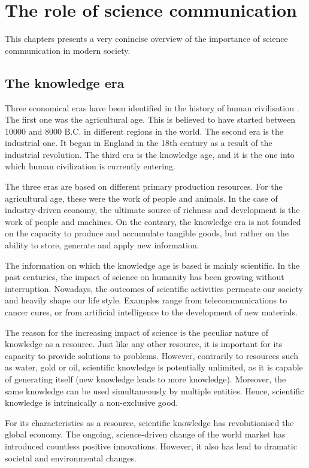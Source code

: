 \chapter{The role of science communication}
This chapters presents a very conincise overview of the importance of science communication in modern society. 

\section{The knowledge era}
Three economical eras have been identified in the history of human civilisation \cite{Aasi1}. The first one was the agricultural age. This is believed to have started between 10000 and 8000 B.C. in different regions in the world. The second era is the industrial one. It began in England in the 18th century as a result of the industrial revolution. The third era is the knowledge age, and it is the one into which human civilization is currently entering. 

The three eras are based on different primary production resources. For the agricultural age, these were the work of people and animals. In the case of industry-driven economy, the ultimate source of richness and development is the work of people and machines. On the contrary, the knowledge era is not founded on the capacity to produce and accumulate tangible goods, but rather on the ability to store, generate and apply new information.

The information on which the knowledge age is based is mainly scientific. In the past centuries, the impact of science on humanity has been growing without interruption. Nowadays, the outcomes of scientific activities permeate our society and heavily shape our life style. Examples range from telecommunications to cancer cures, or from artificial intelligence to the development of new materials.

The reason for the increasing impact of science is the peculiar nature of knowledge as a resource. Just like any other resource, it is important for its capacity to provide solutions to problems. However, contrarily to resources such as water, gold or oil, scientific knowledge is potentially unlimited, as it is capable of generating itself (new knowledge leads to more knowledge). Moreover, the same knowledge can be used simultaneously by multiple entities. Hence, scientific knowledge is intrinsically a non-exclusive good.

For its characteristics as a resource, scientific knowledge has revolutionised the global economy. The ongoing, science-driven change of the world market has introduced countless positive innovations. However, it also has lead to dramatic societal and environmental changes.   

